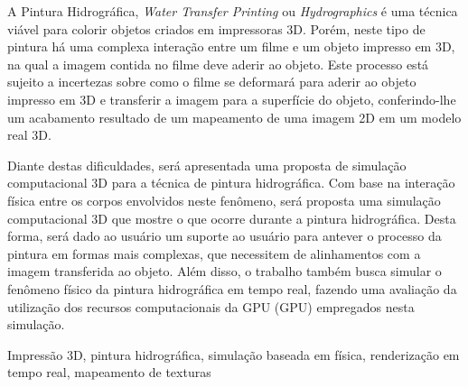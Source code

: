 \resumo

A Pintura Hidrográfica, \textit{Water Transfer Printing} ou \textit{Hydrographics} é uma técnica viável para colorir objetos criados em impressoras 3D. Porém, neste tipo de pintura há uma complexa interação entre um filme e um objeto impresso em 3D, na qual a imagem contida no filme deve aderir ao objeto. Este processo está sujeito a incertezas sobre como o filme se deformará para aderir ao objeto impresso em 3D e transferir a imagem para a superfície do objeto, conferindo-lhe um acabamento resultado de um mapeamento de uma imagem 2D em um modelo real 3D.

Diante destas dificuldades, será apresentada uma proposta de simulação computacional 3D para a técnica de pintura hidrográfica. Com base na interação física entre os corpos envolvidos neste fenômeno, será proposta uma simulação computacional 3D que mostre o que ocorre durante a pintura hidrográfica. Desta forma, será dado ao usuário um suporte ao usuário para antever o processo da pintura em formas mais complexas, que necessitem de alinhamentos com a imagem transferida ao objeto. Além disso, o trabalho também busca simular o fenômeno físico da pintura hidrográfica em tempo real, fazendo uma avaliação da utilização dos recursos computacionais da \acs{GPU} (\acl{GPU}) empregados nesta simulação.
 
\begin{keywords}
Impressão 3D, pintura hidrográfica, simulação baseada em física, renderização em tempo real, mapeamento de texturas 
\end{keywords}
